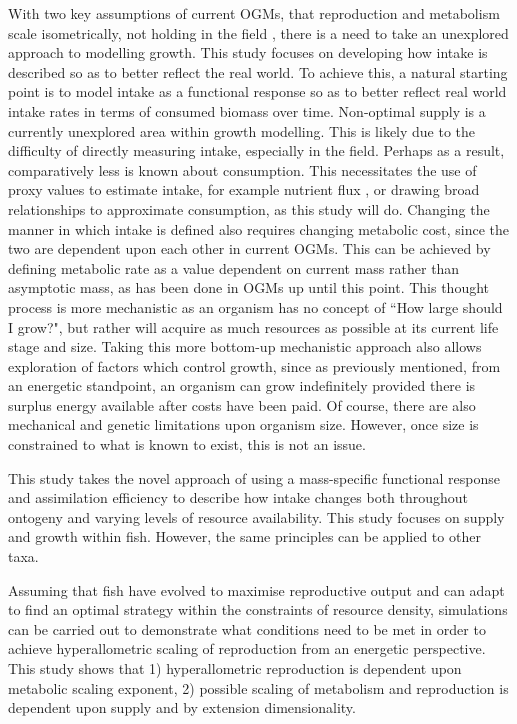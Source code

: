 \documentclass[a4paper, 11pt, hidelinks]{article} %
\begin{document}
	With two key assumptions of current OGMs, that reproduction and metabolism scale isometrically, not holding in the field \parencite{Barneche2018, Peters1983}, there is a need to take an unexplored approach to modelling growth.  This study focuses on developing how intake is described so as to better reflect the real world.  To achieve this, a natural starting point is to model intake as a functional response \parencite{Holling1959} so as to better reflect real world intake rates in terms of consumed biomass over time.  Non-optimal supply is a currently unexplored area within growth modelling.  This is likely due to the difficulty of directly measuring intake, especially in the field. Perhaps as a result, comparatively less is known about consumption.  This necessitates the use of proxy values to estimate intake, for example nutrient flux \parencite{Schiettekatte2020}, or drawing broad relationships to approximate consumption, as this study will do.
	Changing the manner in which intake is defined also requires changing metabolic cost, since the two are dependent upon each other in current OGMs.  This can be achieved by defining metabolic rate as a value dependent on current mass rather than asymptotic mass, as has been done in OGMs up until this point.  This thought process is more mechanistic as an organism has no concept of ``How large should I grow?", but rather will acquire as much resources as possible at its current life stage and size.  Taking this more bottom-up mechanistic approach also allows exploration of factors which control growth, since as previously mentioned, from an energetic standpoint, an organism can grow indefinitely provided there is surplus energy available after costs have been paid.  Of course, there are also mechanical and genetic limitations upon organism size. However, once size is constrained to what is known to exist, this is not an issue.  
	
	This study takes the novel approach of using a mass-specific functional response and assimilation efficiency to describe how intake changes both throughout ontogeny and varying levels of resource availability. This study focuses on supply and growth within fish. However, the same principles can be applied to other taxa.
	
	Assuming that fish have evolved to maximise reproductive output and can adapt to find an optimal strategy within the constraints of resource density, simulations can be carried out to demonstrate what conditions need to be met in order to achieve hyperallometric scaling of reproduction from an energetic perspective.  This study shows that 1) hyperallometric reproduction is dependent upon metabolic scaling exponent, %
	2) possible scaling of metabolism and reproduction is dependent upon supply and by extension dimensionality.
\end{document}
